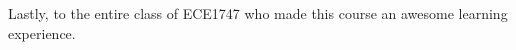 \documentclass[11pt,journal,compsoc]{IEEEtran}
\begin{document}
Lastly, to the entire class of ECE1747 who made this course an awesome learning experience.

\ifCLASSOPTIONcaptionsoff
  \newpage
\fi




%
%
%




\end{document}
